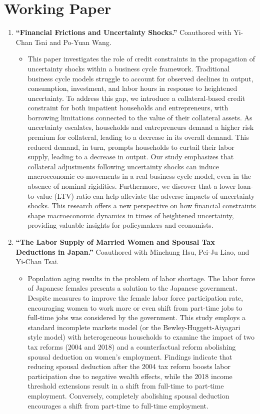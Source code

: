 \documentclass{article}
\begin{document}
\section*{Working Paper}

\begin{enumerate}[resume]
    \item \textbf{“Financial Frictions and Uncertainty Shocks.”} Coauthored with Yi-Chan Tsai and Po-Yuan Wang. 
    \begin{itemize}
        \item[] This paper investigates the role of credit constraints in the propagation of uncertainty shocks within a business cycle framework. Traditional business cycle models struggle to account for observed declines in output, consumption, investment, and labor hours in response to heightened uncertainty. To address this gap, we introduce a collateral-based credit constraint for both impatient households and entrepreneurs, with borrowing limitations connected to the value of their collateral assets. As uncertainty escalates, households and entrepreneurs demand a higher risk premium for collateral, leading to a decrease in its overall demand. This reduced demand, in turn, prompts households to curtail their labor supply, leading to a decrease in output. Our study emphasizes that collateral adjustments following uncertainty shocks can induce macroeconomic co-movements in a real business cycle model, even in the absence of nominal rigidities. Furthermore, we discover that a lower loan-to-value (LTV) ratio can help alleviate the adverse impacts of uncertainty shocks. This research offers a new perspective on how financial constraints shape macroeconomic dynamics in times of heightened uncertainty, providing valuable insights for policymakers and economists.
    \end{itemize}
    \item \textbf{“The Labor Supply of Married Women and Spousal Tax Deductions in Japan.”} Coauthored with Minchung Hsu, Pei-Ju Liao, and Yi-Chan Tsai. 
    \begin{itemize}
        \item[] Population aging results in the problem of labor shortage. The labor force of Japanese females presents a solution to the Japanese government. Despite measures to improve the female labor force participation rate, encouraging women to work more or even shift from part-time jobs to full-time jobs was considered by the government. This study employs a standard incomplete markets model (or the Bewley-Huggett-Aiyagari style model) with heterogeneous households to examine the impact of two tax reforms (2004 and 2018) and a counterfactual reform abolishing spousal deduction on women's employment. Findings indicate that reducing spousal deduction after the 2004 tax reform boosts labor participation due to negative wealth effects, while the 2018 income threshold extensions result in a shift from full-time to part-time employment. Conversely, completely abolishing spousal deduction encourages a shift from part-time to full-time employment.

\end{itemize}
\end{enumerate}
\end{document}
